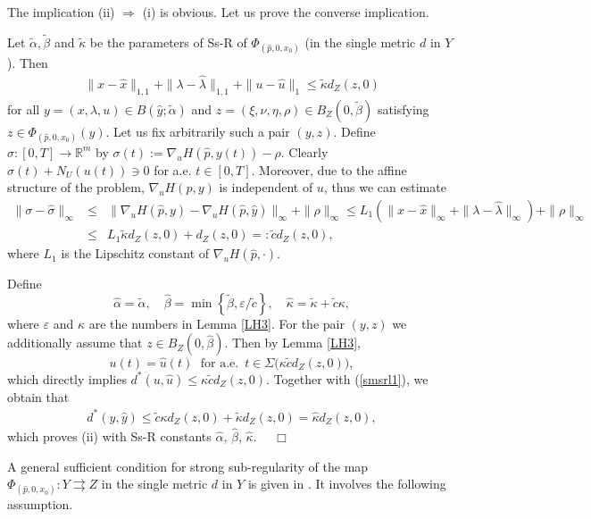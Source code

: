 \documentclass[11pt]{article}
\newcommand{\bd}{\begin{displaymath}}
\newcommand{\ed}{\end{displaymath}}
\newcommand{\bda}{\begin{eqnarray*}}
\newcommand{\eda}{\end{eqnarray*}}
\renewenvironment{proof}[1]{%
\par\vspace{1\baselineskip}%
\noindent{\em Proof#1.\ \ }\ignorespaces }{%
\nobreak\hfill\mbox{\ \ $\Box$}%
\par\vspace{1\baselineskip}%
}
\newcommand{\Mt}{\Rightarrow}
\newcommand{\e}{\varepsilon}
\newcommand{\al}{\alpha}
\newcommand{\To}{\rightrightarrows }
\begin{document}
\begin{proof}{}
The implication (ii) $\Mt$ (i) is obvious. Let us prove the converse implication.

Let $\tilde\alpha,\tilde\beta$ and $\tilde\kappa$ be the parameters of Ss-R of $\Phi_{(\hat p,0,x_0)}$ 
(in the single metric $d$ in $Y$). Then 
\begin{align}\label{smsrl1}
	 \| x -\hat x\|_{1,1} + \| \lambda-\hat\lambda \|_{1,1} + \| u-\hat u \|_1\le\tilde\kappa d_Z(z,0)
\end{align}
for all $y=(x,\lambda,u)\in B(\hat y;\tilde\alpha)$ and $z=(\xi, \nu, \eta,  \rho)\in B_Z(0,\tilde\beta)$ satisfying 
$z\in \Phi_{(\hat p,0,x_0)}(y)$. Let us fix arbitrarily such a pair $(y,z)$.
Define $\sigma:[0,T]\to \mathbb R^m$ by $\sigma(t):=\nabla_u H(\hat p,y(t))-\rho$.
Clearly $\sigma(t) + N_U(u(t)) \ni 0$ for a.e. $t \in [0,T]$. Moreover, due to the affine structure of the problem, 
$\nabla_u H(p,y)$ is independent of $u$, thus we can estimate 
\bda
        \|\sigma-\hat\sigma\|_{\infty} &\leq& \|\nabla_u H(\hat p,y) - \nabla_u H(\hat p,\hat y)\|_\infty + \| \rho \|_\infty 
      \leq L_1(  \| x -\hat x\|_\infty + \| \lambda-\hat\lambda \|_\infty ) + \| \rho \|_\infty \\
      &\leq&  L_1 \tilde \kappa d_Z(z,0) + d_Z(z,0) =: \tilde c d_Z(z,0),
\eda
where $L_1$ is the Lipschitz constant of $\nabla_u H(\hat p,\cdot)$.

Define 
\bd
         \hat\alpha=\tilde\alpha, \quad \hat\beta=\min\left\lbrace \tilde\beta, \e /\tilde c\right\rbrace, \quad
           \hat\kappa=\tilde\kappa+\tilde c\kappa,
\ed
where $\e$ and $\kappa$ are the numbers in Lemma \ref{LH3}. For the pair $(y,z)$ we additionally assume that 
$z\in B_Z(0,\hat\beta)$. Then by Lemma \ref{LH3}, 
\bd
	u(t) = \hat u(t) \;\mbox{  for a.e. } \, t \in \Sigma\big(\kappa\tilde cd_Z(z,0) \big),
\ed
which directly implies $d^*(u,\hat u)\le\kappa\tilde cd_Z(z,0)$. Together with (\ref{smsrl1}), we obtain that
\begin{align*}
         d^*(y,\hat y)\le\tilde c\kappa d_Z(z,0) + \tilde \kappa d_Z(z,0) = \hat \kappa  d_Z(z,0),
 \end{align*}
which proves (ii)  with Ss-R constants $\hat \al$, $\hat \beta$, $\hat \kappa$.
\end{proof}

A general sufficient condition for strong sub-regularity of the map  $\Phi_{(\hat p,0,x_0)} : Y \To Z$ 
in the single metric $d$ in $Y$ is given in \cite[Theorem 3.1]{Os+Ve-20}. It involves the following assumption.
\end{document}
